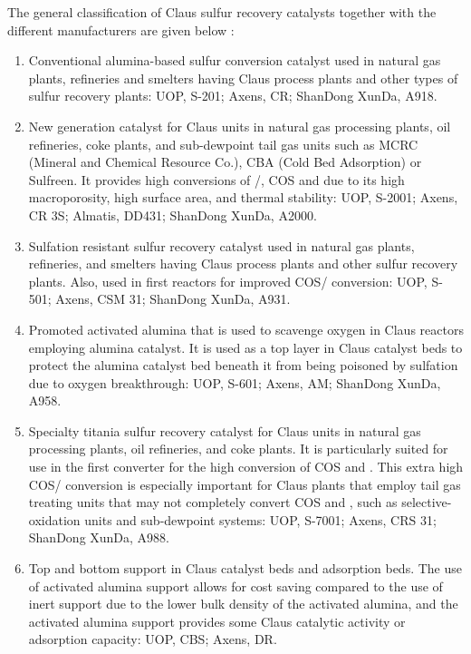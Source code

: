 The general classification of Claus sulfur recovery catalysts together with the different manufacturers are given below \citep{ZareNezhad2009143}:
\begin{enumerate}
\item Conventional alumina-based sulfur conversion catalyst used in natural gas plants, refineries and smelters having Claus process plants and other types of sulfur recovery plants: UOP, S-201; Axens, CR; ShanDong XunDa, A918.
\item New generation catalyst for Claus units in natural gas processing plants, oil refineries, coke plants, and sub-dewpoint tail gas units such as MCRC (Mineral and Chemical Resource Co.), CBA (Cold Bed Adsorption) or Sulfreen. It provides high conversions of /, COS and  due to its high macroporosity, high surface area, and thermal stability: UOP, S-2001; Axens, CR 3S; Almatis, DD431; ShanDong XunDa, A2000.
\item Sulfation resistant sulfur recovery catalyst used in natural gas plants, refineries, and smelters having Claus process plants and other sulfur recovery plants. Also, used in first reactors for improved COS/ conversion: UOP, S-501; Axens, CSM 31; ShanDong XunDa, A931.
\item Promoted activated alumina that is used to scavenge oxygen in Claus reactors employing alumina catalyst. It is used as a top layer in Claus catalyst beds to protect the alumina catalyst bed beneath it from being poisoned by sulfation due to oxygen breakthrough: UOP, S-601; Axens, AM; ShanDong XunDa, A958.
\item Specialty titania sulfur recovery catalyst for Claus units in natural gas processing plants, oil refineries, and coke plants. It is particularly suited for use in the first converter for the high conversion of COS and . This extra high COS/ conversion is especially important for Claus plants that employ tail gas treating units that may not completely convert COS and , such as selective-oxidation units and sub-dewpoint systems: UOP, S-7001; Axens, CRS 31; ShanDong XunDa, A988.
\item Top and bottom support in Claus catalyst beds and adsorption beds. The use of activated alumina support allows for cost saving compared to the use of inert support due to the lower bulk density of the activated alumina, and the activated alumina support provides some Claus catalytic activity or adsorption capacity: UOP, CBS; Axens, DR.
\end{enumerate}

